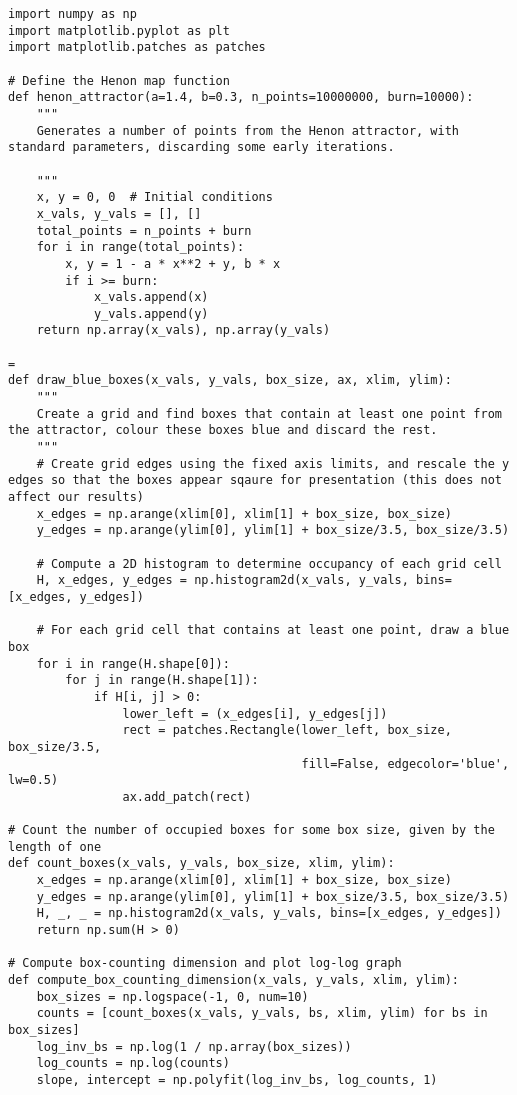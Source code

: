 \begin{lstlisting}[style=python]
import numpy as np
import matplotlib.pyplot as plt
import matplotlib.patches as patches

# Define the Henon map function
def henon_attractor(a=1.4, b=0.3, n_points=10000000, burn=10000):
    """
    Generates a number of points from the Henon attractor, with standard parameters, discarding some early iterations.
    
    """
    x, y = 0, 0  # Initial conditions
    x_vals, y_vals = [], []
    total_points = n_points + burn
    for i in range(total_points):
        x, y = 1 - a * x**2 + y, b * x
        if i >= burn:
            x_vals.append(x)
            y_vals.append(y)
    return np.array(x_vals), np.array(y_vals)

=
def draw_blue_boxes(x_vals, y_vals, box_size, ax, xlim, ylim):
    """
    Create a grid and find boxes that contain at least one point from the attractor, colour these boxes blue and discard the rest.
    """
    # Create grid edges using the fixed axis limits, and rescale the y edges so that the boxes appear sqaure for presentation (this does not affect our results)
    x_edges = np.arange(xlim[0], xlim[1] + box_size, box_size)
    y_edges = np.arange(ylim[0], ylim[1] + box_size/3.5, box_size/3.5)
    
    # Compute a 2D histogram to determine occupancy of each grid cell
    H, x_edges, y_edges = np.histogram2d(x_vals, y_vals, bins=[x_edges, y_edges])
    
    # For each grid cell that contains at least one point, draw a blue box
    for i in range(H.shape[0]):
        for j in range(H.shape[1]):
            if H[i, j] > 0:
                lower_left = (x_edges[i], y_edges[j])
                rect = patches.Rectangle(lower_left, box_size, box_size/3.5,
                                         fill=False, edgecolor='blue', lw=0.5)
                ax.add_patch(rect)

# Count the number of occupied boxes for some box size, given by the length of one 
def count_boxes(x_vals, y_vals, box_size, xlim, ylim):
    x_edges = np.arange(xlim[0], xlim[1] + box_size, box_size)
    y_edges = np.arange(ylim[0], ylim[1] + box_size/3.5, box_size/3.5)
    H, _, _ = np.histogram2d(x_vals, y_vals, bins=[x_edges, y_edges])
    return np.sum(H > 0)

# Compute box-counting dimension and plot log-log graph
def compute_box_counting_dimension(x_vals, y_vals, xlim, ylim):
    box_sizes = np.logspace(-1, 0, num=10)
    counts = [count_boxes(x_vals, y_vals, bs, xlim, ylim) for bs in box_sizes]
    log_inv_bs = np.log(1 / np.array(box_sizes))
    log_counts = np.log(counts)
    slope, intercept = np.polyfit(log_inv_bs, log_counts, 1)
    

\end{lstlisting}
